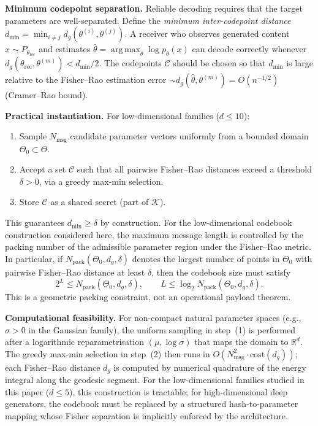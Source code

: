 \documentclass[a4paper,fleqn]{cas-dc}
\DeclareMathOperator*{\argmax}{arg\,max}
\newcommand{\R}{\mathbb{R}}
\begin{document}
\noindent\textbf{Minimum codepoint separation.}
Reliable decoding requires that the target parameters are well-separated.
Define the \emph{minimum inter-codepoint distance}
$d_{\min} = \min_{i\neq j} d_g(\theta^{(i)}, \theta^{(j)})$.
A receiver who observes generated content $x\sim P_{\theta_{\mathrm{rec}}}$
and estimates $\hat\theta = \argmax_\theta \log p_\theta(x)$ can decode
correctly whenever $d_g(\theta_{\mathrm{rec}}, \theta^{(m)}) < d_{\min}/2$.
The codepoints $\mathcal{C}$ should be chosen so that $d_{\min}$ is large
relative to the Fisher--Rao estimation error
$\sim d_g(\hat\theta, \theta^{(m)}) = O(n^{-1/2})$ (Cramer--Rao bound).

\noindent\textbf{Practical instantiation.}
For low-dimensional families ($d\leq 10$):
\begin{enumerate}[label=(\arabic*)]
  \item Sample $N_{\mathrm{msg}}$ candidate parameter vectors uniformly from
        a bounded domain $\Theta_0\subset\Theta$.
  \item Accept a set $\mathcal{C}$ such that all pairwise Fisher--Rao
        distances exceed a threshold $\delta > 0$, via a greedy
        max-min selection.
  \item Store $\mathcal{C}$ as a shared secret (part of $\mathcal{K}$).
\end{enumerate}
This guarantees $d_{\min}\geq\delta$ by construction.
For the low-dimensional codebook construction considered here, the maximum
message length is controlled by the packing number of the admissible
parameter region under the Fisher--Rao metric. In particular, if
$N_{\mathrm{pack}}(\Theta_0,d_g,\delta)$ denotes the largest number of
points in $\Theta_0$ with pairwise Fisher--Rao distance at least $\delta$,
then the codebook size must satisfy
\[
2^L \leq N_{\mathrm{pack}}(\Theta_0,d_g,\delta),
\qquad
L \leq \log_2 N_{\mathrm{pack}}(\Theta_0,d_g,\delta).
\]
This is a geometric packing constraint, not an operational payload theorem.

\noindent\textbf{Computational feasibility.}
For non-compact natural parameter spaces (e.g., $\sigma>0$ in the
Gaussian family), the uniform sampling in step~(1) is performed after
a logarithmic reparametrisation $(\mu,\log\sigma)$ that maps the domain
to $\R^{d}$.  The greedy max-min selection in step~(2) then runs in
$O(N_{\mathrm{msg}}^{2}\cdot\mathrm{cost}(d_{g}))$; each Fisher--Rao
distance $d_{g}$ is computed by numerical quadrature of the energy
integral along the geodesic segment.  For the low-dimensional families
studied in this paper ($d\leq 5$), this construction is tractable;
for high-dimensional deep generators, the codebook must be replaced by
a structured hash-to-parameter mapping whose Fisher separation is
implicitly enforced by the architecture.
\end{document}
